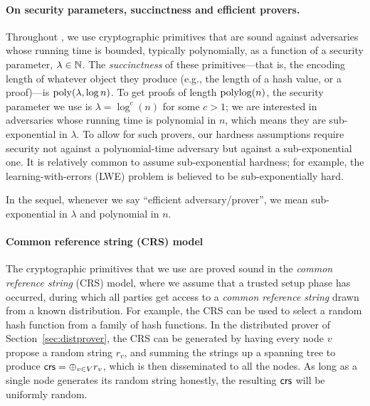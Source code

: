 \paragraph{On security parameters, succinctness and efficient provers.}
Throughout , we use cryptographic primitives
that are sound against adversaries whose running time is bounded, typically polynomially, as a function
of a security parameter, $\lambda \in \mathbb{N}$.
The \emph{succinctness} of these primitives---that is, the encoding length of whatever object they produce (e.g., the length of a hash value, or a proof)---is $\operatorname{poly}(\lambda, \log n)$.
To get proofs of length $\operatorname{polylog}(n)$, the security parameter we use is $\lambda = \log^c(n)$
for some $c > 1$;
we are interested in adversaries whose running time is polynomial in $n$,
which means they are sub-exponential in $\lambda$. %
To allow for such provers, our hardness assumptions require security not against a polynomial-time adversary
but against a sub-exponential one.
It is relatively common to assume sub-exponential hardness;
for example, the learning-with-errors (LWE) problem is believed to be sub-exponentially hard.

In the sequel, whenever we say ``efficient adversary/prover'',
we mean sub-exponential in $\lambda$ and polynomial in $n$.

\paragraph{Common reference string (CRS) model}
The cryptographic primitives that we use are proved sound in the \emph{common reference string} (CRS) model,
where we assume that a trusted setup phase has occurred, during which all parties get access to
a \emph{common reference string} drawn from a known distribution.
For example, the CRS can be used to select a random hash function
from a family of hash functions.
In the distributed prover of Section~\ref{sec:distprover},
the CRS can be generated by having every node $v$ propose a random string $r_v$,
and summing the strings up a spanning tree to produce $\mathsf{crs} = \oplus_{v \in V} r_v$,
which is then disseminated to all the nodes. As long as a single node generates its random string honestly, the resulting $\mathsf{crs}$
will be uniformly random.

